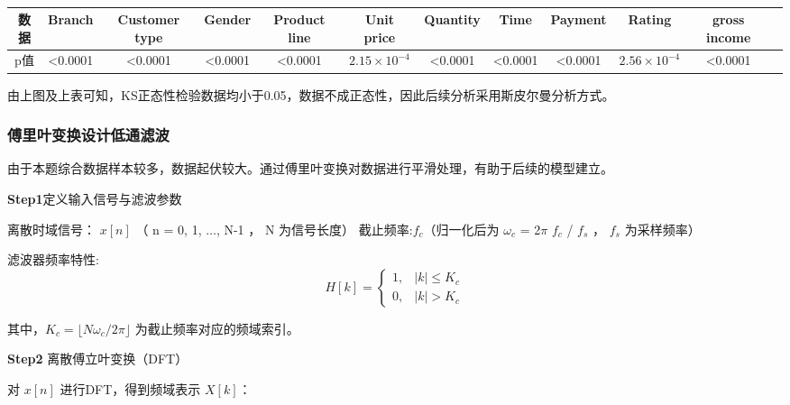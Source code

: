 \documentclass[withoutpreface,bwprint]{cumcmthesis}
\begin{document}
\begin{table}[H]
    \caption{}
    \label{tab:gross_margin_prediction}
    \centering
    \fontsize{5}{7}\selectfont %
    \begin{tabularx}{\textwidth}{CCCCCCCCCCCC} %
        \toprule[1.5pt]
        数据 & Branch & Customer type & Gender & Product line & Unit price & Quantity & Time & Payment & Rating & gross income \\
        \midrule[1pt]
        p值 & <0.0001 & <0.0001 & <0.0001 & <0.0001 & $2.15\times 10^{-4}$ & <0.0001 & <0.0001 & <0.0001 & $2.56\times 10^{-4}$ & <0.0001 \\
        \bottomrule[1.5pt]
    \end{tabularx}
\end{table}



由上图及上表可知，KS正态性检验数据均小于0.05，数据不成正态性，因此后续分析采用斯皮尔曼分析方式。

\subsubsection{傅里叶变换设计低通滤波}
由于本题综合数据样本较多，数据起伏较大。通过傅里叶变换对数据进行平滑处理，有助于后续的模型建立。


\textbf{Step1}定义输入信号与滤波参数
\par
离散时域信号： $x[n]$ （ n = 0, 1, $\dots$, N-1 ， N  为信号长度）
截止频率:$f_c$（归一化后为 $ \omega_c$ = 2$\pi$ $f_c$ / $f_s$ ， $f_s$  为采样频率）
\par
滤波器频率特性:
\begin{equation}
\label{eq:公式1}
H[k] = 
\begin{cases} 
1, & |k| \leq K_c \\
0, & |k| > K_c 
\end{cases} 
\end{equation}
\par
其中，$K_c = \lfloor N\omega_c / 2\pi \rfloor$  为截止频率对应的频域索引。



\textbf{Step2} 离散傅立叶变换（DFT）
\par
对  $x[n]$  进行DFT，得到频域表示 $ X[k]$：
\par
\end{document}
